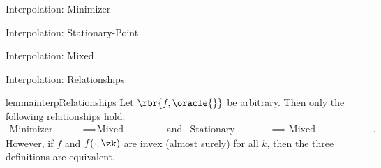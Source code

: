 \documentclass[mathserif,notheorems, hyperref={colorlinks, citecolor=blue, urlcolor=blue, linkcolor=blue}]{beamer}
\def\\{}%
\begin{document}
    \begin{frame}{Interpolation: Minimizer}
        \begin{figure}
            \centering 
             
        \end{figure}
        
        \interpolationMinima*

    \end{frame}


    \begin{frame}{Interpolation: Stationary-Point}
        \begin{figure}
           \centering 
             
        \end{figure}
        
        \interpolationGradients*

    \end{frame}

    \begin{frame}{Interpolation: Mixed}
        \begin{figure}
           \centering 
             
        \end{figure}

        \interpolationMixed*

    \end{frame}

    \begin{frame}{Interpolation: Relationships}

        \begin{restatable}{lemma}{interpRelationships}
            Let \( \rbr{f, \oracle{}} \) be arbitrary. 
            Then only the following relationships hold: 
            \begin{align*}
                \text{Minimizer Interpolation} &\implies \text{Mixed Interpolation} \\
                                                                                       & \text{and} &\\
                \text{Stationary-Point Interpolation} &\implies \text{Mixed Interpolation}.
            \end{align*}
            However, if \( f \) and \( f(\cdot, \zk) \) are invex (almost surely) for all \( k \), then the three definitions are equivalent. 
        \end{restatable}
        
    \end{frame}
  
\end{document}
